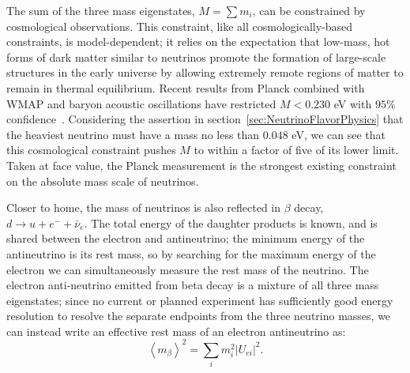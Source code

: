 The sum of the three mass eigenstates, $M = \sum m_i$, can be constrained by cosmological observations.  This constraint, like all cosmologically-based constraints, is model-dependent; it relies on the expectation that low-mass, hot forms of dark matter similar to neutrinos promote the formation of large-scale structures in the early universe by allowing extremely remote regions of matter to remain in thermal equilibrium.  Recent results from Planck combined with WMAP and baryon acoustic oscillations have restricted $M < 0.230$ eV with $95\%$ confidence~\cite{CosmologicalLimits}.  Considering the assertion in section~\ref{sec:NeutrinoFlavorPhysics} that the heaviest neutrino must have a mass no less than $0.048$ eV, we can see that this cosmological constraint pushes $M$ to within a factor of five of its lower limit. Taken at face value, the Planck measurement is the strongest existing constraint on the absolute mass scale of neutrinos.

Closer to home, the mass of neutrinos is also reflected in $\beta$ decay, $d \rightarrow u + e^- + \bar{\nu}_e$.  The total energy of the daughter products is known, and is shared between the electron and antineutrino; the minimum energy of the antineutrino is its rest mass, so by searching for the maximum energy of the electron we can simultaneously measure the rest mass of the neutrino.  The electron anti-neutrino emitted from beta decay is a mixture of all three mass eigenstates; since no current or planned experiment has sufficiently good energy resolution to resolve the separate endpoints from the three neutrino masses, we can instead write an effective rest mass of an electron antineutrino as:~\cite{RMPbb0n}
\begin{equation} \label{eqn:DefinitionOfMBeta}
\left< m_\beta \right>^2 = \sum_i m_i^2 \left| U_{ei} \right|^2.
\end{equation}


